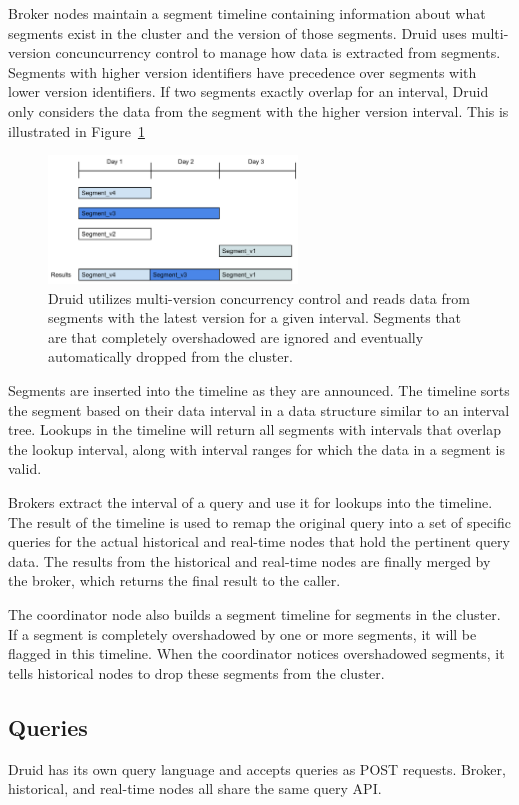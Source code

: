 \documentclass{vldb}
\begin{document}
Broker nodes maintain a segment timeline containing information about what
segments exist in the cluster and the version of those segments. Druid uses
multi-version concuncurrency control to manage how data is extracted from
segments. Segments with higher version identifiers have precedence over
segments with lower version identifiers. If two segments exactly overlap for an
interval, Druid only considers the data from the segment with the higher
version interval. This is illustrated in Figure~\ref{fig:timeline}

\begin{figure}
\centering
\includegraphics[width = 2.6in]{timeline}
\caption{
Druid utilizes multi-version concurrency control and reads data from segments
with the latest version for a given interval. Segments that are that completely
overshadowed are ignored and eventually automatically dropped from the cluster.
}
\label{fig:timeline}
\end{figure}

Segments are inserted into the timeline as they are announced. The timeline
sorts the segment based on their data interval in a data structure similar to
an interval tree. Lookups in the timeline will return all segments with
intervals that overlap the lookup interval, along with interval ranges for
which the data in a segment is valid. 

Brokers extract the interval of a query and use it for lookups into the
timeline. The result of the timeline is used to remap the original query into a
set of specific queries for the actual historical and real-time nodes that hold
the pertinent query data. The results from the historical and real-time nodes
are finally merged by the broker, which returns the final result to the caller.

The coordinator node also builds a segment timeline for segments in the
cluster. If a segment is completely overshadowed by one or more segments, it
will be flagged in this timeline. When the coordinator notices overshadowed
segments, it tells historical nodes to drop these segments from the cluster.

\subsection{Queries}
Druid has its own query language and accepts queries as POST requests. Broker,
historical, and real-time nodes all share the same query API. 
\end{document}
